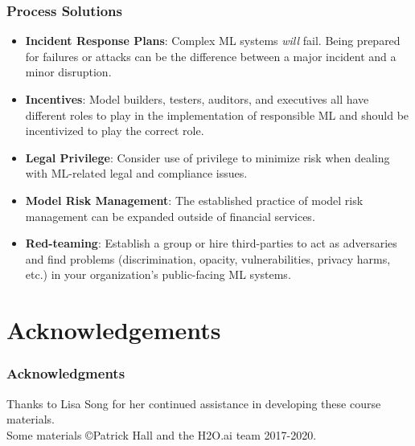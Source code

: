 \documentclass[11pt,
               aspectratio=169,
               hyperref={colorlinks}
               ]{beamer}
\begin{document}
		\begin{frame}
			
			\frametitle{Process Solutions}	
				
			\begin{itemize}
				
				\item \textbf{Incident Response Plans}: Complex ML systems \textit{will} fail. Being prepared for failures or attacks can be the difference between a major incident and a minor disruption.
				
				\item \textbf{Incentives}: Model builders, testers, auditors, and executives all have different roles to play in the implementation of responsible ML and should be incentivized to play the correct role.
				
				\item \textbf{Legal Privilege}: Consider use of privilege to minimize risk when dealing with ML-related legal and compliance issues.
				
				\item \textbf{Model Risk Management}: The established practice of model risk management can be expanded outside of financial services.
				
				\item \textbf{Red-teaming}: Establish a group or hire third-parties to act as adversaries and find problems (discrimination, opacity, vulnerabilities, privacy harms, etc.) in your organization's public-facing ML systems.
				
			\end{itemize}
			
		\end{frame}	

\section{Acknowledgements} 

\begin{frame}
	
	\frametitle{Acknowledgments}
	
	Thanks to Lisa Song for her continued assistance in developing these course materials.\\
	\vspace{10pt}
	Some materials \copyright\hspace{1pt}Patrick Hall and the H2O.ai team 2017-2020.  
	
\end{frame}	
\end{document}
